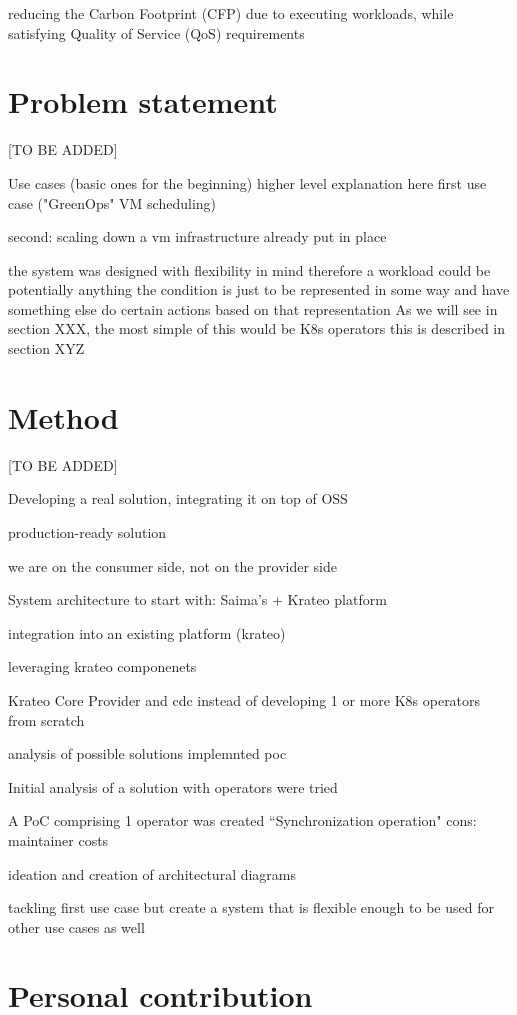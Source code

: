 reducing the Carbon Footprint (CFP) due to
executing workloads, 
while satisfying Quality of Service (QoS)
requirements

\section{Problem statement}
\label{sec:problem}

[TO BE ADDED]

Use cases (basic ones for the beginning) higher level explanation here
first use case ("GreenOps" VM scheduling)

second: scaling down a vm 
infrastructure already put in place

the system was designed with flexibility in mind therefore a workload could be potentially anything
the condition is just to be represented in some way and have something else do certain actions based on that representation
As we will see in section XXX, the most simple of this would be K8s operators
this is described in section XYZ

\section{Method}

[TO BE ADDED]

Developing a real solution, integrating it on top of OSS

production-ready solution

we are on the consumer side, not on the provider side

System architecture to start with: Saima's + Krateo platform

integration into an existing platform (krateo)

leveraging krateo componenets

Krateo Core Provider and cdc instead of developing 1 or more K8s operators from scratch


analysis of possible solutions
implemnted poc 

Initial analysis of a solution with operators were tried

A PoC comprising 1 operator was created 
``Synchronization operation"
cons: maintainer costs

ideation and creation of architectural diagrams

tackling first use case
but create a system that is flexible enough to be used for other use cases as well

\section{Personal contribution}

